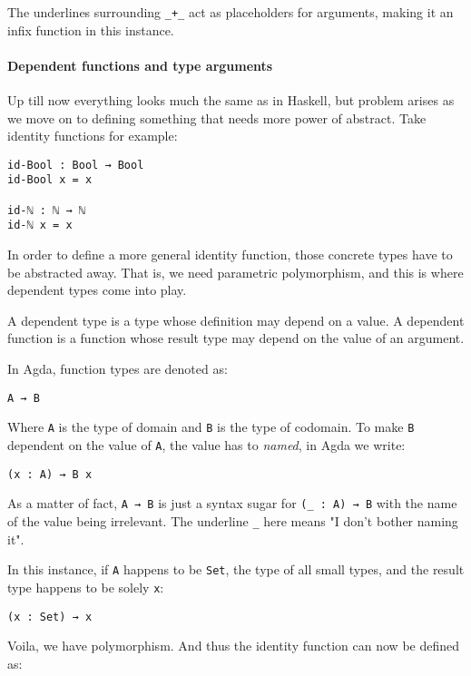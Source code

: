 \documentclass[12pt, a4paper]{article}
\begin{document}
The underlines surrounding {\lstinline|_+_|} act as placeholders for arguments, making
it an infix function in this instance.

\paragraph{Dependent functions and type arguments}
Up till now everything looks much the same as in Haskell, but problem arises as
we move on to defining something that needs more power of abstract. Take identity
functions for example:

\begin{lstlisting}
id-Bool : Bool → Bool
id-Bool x = x

id-ℕ : ℕ → ℕ
id-ℕ x = x
\end{lstlisting}

In order to define a more general identity function, those concrete types have
to be abstracted away. That is, we need parametric polymorphism, and this is
where dependent types come into play.

A dependent type is a type whose definition may depend on a value. A dependent
function is a function whose result type may depend on the value of an argument.

In Agda, function types are denoted as:

\begin{lstlisting}
A → B
\end{lstlisting}

Where {\lstinline|A|} is the type of domain and {\lstinline|B|} is the type of
codomain. To make {\lstinline|B|} dependent on the value of {\lstinline|A|}, the
value has to \textit{named}, in Agda we write:

\begin{lstlisting}
(x : A) → B x
\end{lstlisting}

As a matter of fact, {\lstinline|A → B|} is just a syntax sugar for {\lstinline|(_ : A) → B|}
with the name of the value being irrelevant. The underline {\lstinline|_|} here
means "I don't bother naming it".

In this instance, if {\lstinline|A|} happens to be {\lstinline|Set|}, the type
of all small types, and the result type happens to be solely {\lstinline|x|}:

\begin{lstlisting}
(x : Set) → x
\end{lstlisting}

Voila, we have polymorphism. And thus the identity function can now be defined as:
\end{document}
